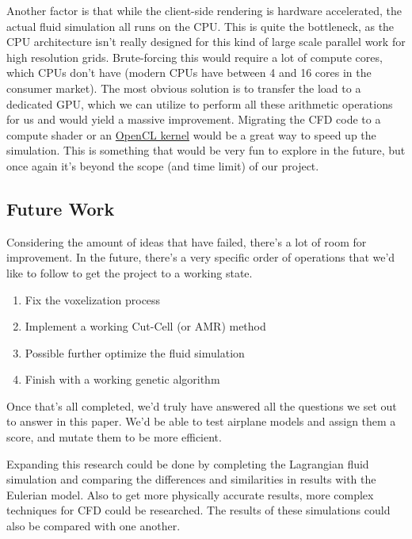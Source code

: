 \documentclass[a4paper,12pt,titlepage]{article}
\begin{document}
Another factor is that while the client-side rendering is hardware accelerated,
the actual fluid simulation all runs on the CPU. This is quite the bottleneck,
as the CPU architecture isn't really designed for this kind of large scale
parallel work for high resolution grids. Brute-forcing this would require a lot
of compute cores, which CPUs don't have (modern CPUs have between 4 and 16 cores
in the consumer market). The most obvious solution is to transfer the load to
a dedicated GPU, which we can utilize to perform all these arithmetic operations
for us and would yield a massive improvement. Migrating the CFD code to a compute
shader or an \href{https://en.wikipedia.org/wiki/OpenCL}{OpenCL kernel} would
be a great way to speed up the simulation. This is something that would be very
fun to explore in the future, but once again it's beyond the scope (and time limit)
of our project.

\subsection{Future Work}
Considering the amount of ideas that have failed, there's a lot of room for
improvement. In the future, there's a very specific order of operations that
we'd like to follow to get the project to a working state.
\begin{enumerate}
	\item{Fix the voxelization process}
	\item{Implement a working Cut-Cell (or AMR) method}
	\item{Possible further optimize the fluid simulation}
	\item{Finish with a working genetic algorithm}
\end{enumerate}
Once that's all completed, we'd truly have answered all the questions we set out
to answer in this paper. We'd be able to test airplane models and assign them a score,
and mutate them to be more efficient.

Expanding this research could be done by completing the Lagrangian fluid simulation
and comparing the differences and similarities in results with the Eulerian model.
Also to get more physically accurate results, more complex techniques for CFD could be researched.
The results of these simulations could also be compared with one another. 

\pagebreak
\end{document}
